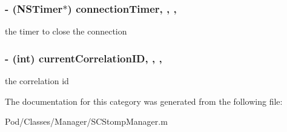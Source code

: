 \subsubsection[{\texorpdfstring{connection\+Timer}{connectionTimer}}]{\setlength{\rightskip}{0pt plus 5cm}-\/ (N\+S\+Timer$\ast$) connection\+Timer\hspace{0.3cm}{\ttfamily [read]}, {\ttfamily [write]}, {\ttfamily [nonatomic]}, {\ttfamily [retain]}}\hypertarget{category_s_c_stomp_manager_07_08_a9134fe65e24f68d532c032e9b2bc8f9c}{}\label{category_s_c_stomp_manager_07_08_a9134fe65e24f68d532c032e9b2bc8f9c}
the timer to close the connection 
\subsubsection[{\texorpdfstring{current\+Correlation\+ID}{currentCorrelationID}}]{\setlength{\rightskip}{0pt plus 5cm}-\/ (int) current\+Correlation\+ID\hspace{0.3cm}{\ttfamily [read]}, {\ttfamily [write]}, {\ttfamily [nonatomic]}, {\ttfamily [assign]}}\hypertarget{category_s_c_stomp_manager_07_08_a86c0ffd921e9b2aa866eb389a59c22dd}{}\label{category_s_c_stomp_manager_07_08_a86c0ffd921e9b2aa866eb389a59c22dd}
the correlation id 

The documentation for this category was generated from the following file\+:\begin{DoxyCompactItemize}
\item 
Pod/\+Classes/\+Manager/S\+C\+Stomp\+Manager.\+m\end{DoxyCompactItemize}
